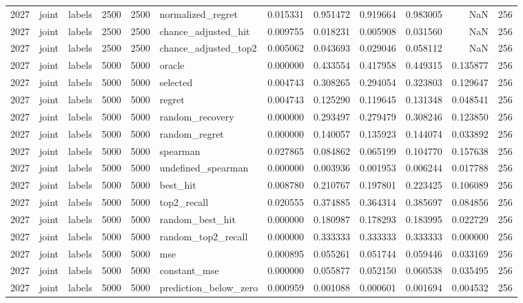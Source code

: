 \begin{tabular}{rllrrlrrrrrr}
2027 & joint & labels & 2500 & 2500 & normalized_regret & 0.015331 & 0.951472 & 0.919664 & 0.983005 & NaN & 256 \\
2027 & joint & labels & 2500 & 2500 & chance_adjusted_hit & 0.009755 & 0.018231 & 0.005908 & 0.031560 & NaN & 256 \\
2027 & joint & labels & 2500 & 2500 & chance_adjusted_top2 & 0.005062 & 0.043693 & 0.029046 & 0.058112 & NaN & 256 \\
2027 & joint & labels & 5000 & 5000 & oracle & 0.000000 & 0.433554 & 0.417958 & 0.449315 & 0.135877 & 256 \\
2027 & joint & labels & 5000 & 5000 & selected & 0.004743 & 0.308265 & 0.294054 & 0.323803 & 0.129647 & 256 \\
2027 & joint & labels & 5000 & 5000 & regret & 0.004743 & 0.125290 & 0.119645 & 0.131348 & 0.048541 & 256 \\
2027 & joint & labels & 5000 & 5000 & random_recovery & 0.000000 & 0.293497 & 0.279479 & 0.308246 & 0.123850 & 256 \\
2027 & joint & labels & 5000 & 5000 & random_regret & 0.000000 & 0.140057 & 0.135923 & 0.144074 & 0.033892 & 256 \\
2027 & joint & labels & 5000 & 5000 & spearman & 0.027865 & 0.084862 & 0.065199 & 0.104770 & 0.157638 & 256 \\
2027 & joint & labels & 5000 & 5000 & undefined_spearman & 0.000000 & 0.003936 & 0.001953 & 0.006244 & 0.017788 & 256 \\
2027 & joint & labels & 5000 & 5000 & best_hit & 0.008780 & 0.210767 & 0.197801 & 0.223425 & 0.106089 & 256 \\
2027 & joint & labels & 5000 & 5000 & top2_recall & 0.020555 & 0.374885 & 0.364314 & 0.385697 & 0.084856 & 256 \\
2027 & joint & labels & 5000 & 5000 & random_best_hit & 0.000000 & 0.180987 & 0.178293 & 0.183995 & 0.022729 & 256 \\
2027 & joint & labels & 5000 & 5000 & random_top2_recall & 0.000000 & 0.333333 & 0.333333 & 0.333333 & 0.000000 & 256 \\
2027 & joint & labels & 5000 & 5000 & mse & 0.000895 & 0.055261 & 0.051744 & 0.059446 & 0.033169 & 256 \\
2027 & joint & labels & 5000 & 5000 & constant_mse & 0.000000 & 0.055877 & 0.052150 & 0.060538 & 0.035495 & 256 \\
2027 & joint & labels & 5000 & 5000 & prediction_below_zero & 0.000959 & 0.001088 & 0.000601 & 0.001694 & 0.004532 & 256 \\

\end{tabular}
